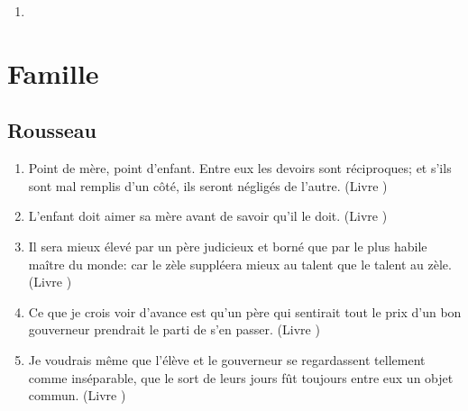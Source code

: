 \documentclass[a4paper, 11pt, hidelinks]{article}
\newcommand{\rb}[1]{\Romanbar{#1}}
\begin{document}
\begin{enumerate}
    \item 
\end{enumerate}






































\section{Famille}



\subsection{Rousseau}


\begin{enumerate}
    \item Point de mère, point d'enfant. Entre eux les devoirs sont réciproques; et s'ils sont mal remplis d'un côté, ils seront négligés de l'autre. (Livre \rb{1})
    \item L'enfant doit aimer sa mère avant de savoir qu'il le doit. (Livre \rb{1})
    \item Il sera mieux élevé par un père judicieux et borné que par le plus habile maître du monde: car le zèle suppléera mieux au talent que le talent au zèle. (Livre \rb{1})
    \item Ce que je crois voir d'avance est qu'un père qui sentirait tout le prix d'un bon gouverneur prendrait le parti de s'en passer. (Livre \rb{1})
    \item Je voudrais même que l'élève et le gouverneur se regardassent tellement comme inséparable, que le sort de leurs jours fût toujours entre eux un objet commun. (Livre \rb{1})
\end{enumerate}
\end{document}

